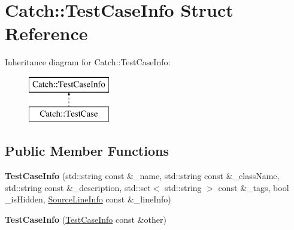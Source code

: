 \hypertarget{struct_catch_1_1_test_case_info}{\section{Catch\-:\-:Test\-Case\-Info Struct Reference}
\label{struct_catch_1_1_test_case_info}
}
Inheritance diagram for Catch\-:\-:Test\-Case\-Info\-:\begin{figure}[H]
\begin{center}
\leavevmode
\includegraphics[height=2.000000cm]{struct_catch_1_1_test_case_info}
\end{center}
\end{figure}
\subsection*{Public Member Functions}
\begin{DoxyCompactItemize}
\item 
\hypertarget{struct_catch_1_1_test_case_info_a6bd4c4e3fab75ba12f6592d3e3bf8c34}{{\bfseries Test\-Case\-Info} (std\-::string const \&\-\_\-name, std\-::string const \&\-\_\-class\-Name, std\-::string const \&\-\_\-description, std\-::set$<$ std\-::string $>$ const \&\-\_\-tags, bool \-\_\-is\-Hidden, \hyperlink{struct_catch_1_1_source_line_info}{Source\-Line\-Info} const \&\-\_\-line\-Info)}\label{struct_catch_1_1_test_case_info_a6bd4c4e3fab75ba12f6592d3e3bf8c34}

\item 
\hypertarget{struct_catch_1_1_test_case_info_ac338adb4e38f4bf3977fb45b2b1fe447}{{\bfseries Test\-Case\-Info} (\hyperlink{struct_catch_1_1_test_case_info}{Test\-Case\-Info} const \&other)}\label{struct_catch_1_1_test_case_info_ac338adb4e38f4bf3977fb45b2b1fe447}

\end{DoxyCompactItemize}
